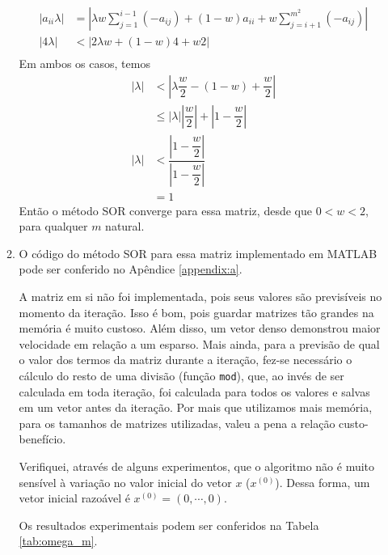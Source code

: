 \documentclass{article}
\begin{document}
\begin{enumerate}
\begin{enumerate}
                \begin{align*}
                    |a_{ii} \lambda| &= \left|\lambda w \sum_{j=1}^{i-1} (-a_{ij}) + (1-w)a_{ii} + w \sum_{j=i+1}^{m^2} (-a_{ij})\right| \\
                    |4 \lambda| &< \left|2\lambda w + (1-w)4 + w 2\right| \\
                \end{align*}
                Em ambos os casos, temos
                \begin{align*}
                    |\lambda| &< \left|\lambda \dfrac{w}{2} - (1-w) + \dfrac{w}{2} \right| \\
                    & \le |\lambda| \left|\dfrac{w}{2}\right| + \left|1 - \dfrac{w}{2}\right| \\
                    |\lambda| &< \dfrac{\left|1 - \dfrac{w}{2}\right|}{\left|1 - \dfrac{w}{2}\right|} \\
                    &= 1
                \end{align*}
                Então o método SOR converge para essa matriz, desde que $0 < w < 2$, para qualquer $m$ natural.

            \item O código do método SOR para essa matriz implementado em MATLAB pode ser conferido no Apêndice \ref{appendix:a}.
            
                A matriz em si não foi implementada, pois seus valores são previsíveis no momento da iteração.
                Isso é bom, pois guardar matrizes tão grandes na memória é muito custoso.
                Além disso, um vetor denso demonstrou maior velocidade em relação a um esparso.
                Mais ainda, para a previsão de qual o valor dos termos da matriz durante a iteração, fez-se necessário
                o cálculo do resto de uma divisão (função \lstinline{mod}), que, ao invés de ser calculada em toda iteração,
                foi calculada para todos os valores e salvas em um vetor antes da iteração. Por mais que utilizamos mais memória,
                para os tamanhos de matrizes utilizadas, valeu a pena a relação custo-benefício.

                Verifiquei, através de alguns experimentos, que o algoritmo não é muito sensível à variação no valor inicial do vetor $x$ ($x^{(0)}$).
                Dessa forma, um vetor inicial razoável é $x^{(0)}=(0, \cdots, 0)$.


                Os resultados experimentais podem ser conferidos na Tabela \ref{tab:omega_m}.


\end{enumerate}
\end{enumerate}
\end{document}
